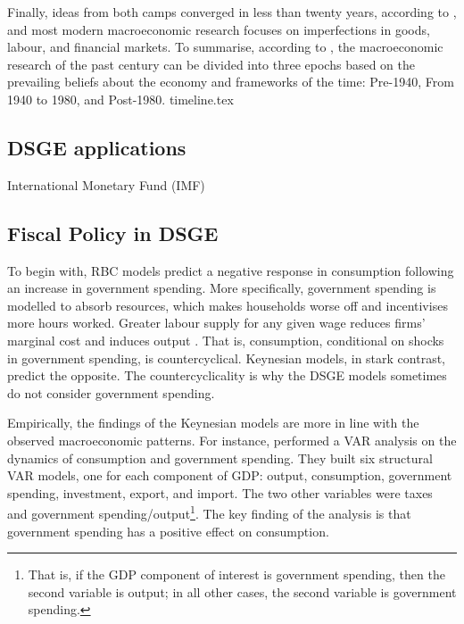 Finally, ideas from both camps converged in less than twenty years, according to \textcite[1388]{blanchard_2000_what}, and most modern macroeconomic research focuses on imperfections in goods, labour, and financial markets. To summarise, according to \textcites{blanchard_2000_what}{snowdon_1994_a}, the macroeconomic research of the past century can be divided into three epochs based on the prevailing beliefs about the economy and frameworks of the time: Pre-1940, From 1940 to 1980, and Post-1980. 
{timeline.tex}

\subsection{DSGE applications}
International Monetary Fund (IMF)

\subsection{Fiscal Policy in DSGE}

To begin with, RBC models predict a negative response in consumption following an increase in government spending. More specifically, government spending is modelled to absorb resources, which makes households worse off and incentivises more hours worked. Greater labour supply for any given wage reduces firms' marginal cost and induces output \parencite[319]{baxter_1993_fiscal}. That is, consumption, conditional on shocks in government spending, is countercyclical. Keynesian models, in stark contrast, predict the opposite. The countercyclicality is why the DSGE models sometimes do not consider government spending. 

Empirically, the findings of the Keynesian models are more in line with the observed macroeconomic patterns. For instance, \textcite{blanchard_2002_an} performed a VAR analysis on the dynamics of consumption and government spending. They built six structural VAR models, one for each component of GDP: output, consumption, government spending, investment, export, and import. The two other variables were taxes and government spending/output\footnote{That is, if the GDP component of interest is government spending, then the second variable is output; in all other cases, the second variable is government spending.}. The key finding of the analysis is that government spending has a positive effect on consumption. 

